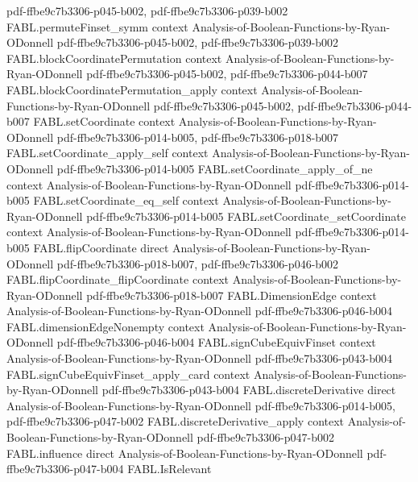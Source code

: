 \begin{theorem}
  {pdf-ffbe9c7b3306-p045-b002,
    pdf-ffbe9c7b3306-p039-b002}
\proofstep
  {FABL.permuteFinset_symm}
  {context}
  {Analysis-of-Boolean-Functions-by-Ryan-ODonnell}
  {pdf-ffbe9c7b3306-p045-b002,
    pdf-ffbe9c7b3306-p039-b002}
\proofstep
  {FABL.blockCoordinatePermutation}
  {context}
  {Analysis-of-Boolean-Functions-by-Ryan-ODonnell}
  {pdf-ffbe9c7b3306-p045-b002,
    pdf-ffbe9c7b3306-p044-b007}
\proofstep
  {FABL.blockCoordinatePermutation_apply}
  {context}
  {Analysis-of-Boolean-Functions-by-Ryan-ODonnell}
  {pdf-ffbe9c7b3306-p045-b002,
    pdf-ffbe9c7b3306-p044-b007}
\proofstep
  {FABL.setCoordinate}
  {context}
  {Analysis-of-Boolean-Functions-by-Ryan-ODonnell}
  {pdf-ffbe9c7b3306-p014-b005,
    pdf-ffbe9c7b3306-p018-b007}
\proofstep
  {FABL.setCoordinate_apply_self}
  {context}
  {Analysis-of-Boolean-Functions-by-Ryan-ODonnell}
  {pdf-ffbe9c7b3306-p014-b005}
\proofstep
  {FABL.setCoordinate_apply_of_ne}
  {context}
  {Analysis-of-Boolean-Functions-by-Ryan-ODonnell}
  {pdf-ffbe9c7b3306-p014-b005}
\proofstep
  {FABL.setCoordinate_eq_self}
  {context}
  {Analysis-of-Boolean-Functions-by-Ryan-ODonnell}
  {pdf-ffbe9c7b3306-p014-b005}
\proofstep
  {FABL.setCoordinate_setCoordinate}
  {context}
  {Analysis-of-Boolean-Functions-by-Ryan-ODonnell}
  {pdf-ffbe9c7b3306-p014-b005}
\proofstep
  {FABL.flipCoordinate}
  {direct}
  {Analysis-of-Boolean-Functions-by-Ryan-ODonnell}
  {pdf-ffbe9c7b3306-p018-b007,
    pdf-ffbe9c7b3306-p046-b002}
\proofstep
  {FABL.flipCoordinate_flipCoordinate}
  {context}
  {Analysis-of-Boolean-Functions-by-Ryan-ODonnell}
  {pdf-ffbe9c7b3306-p018-b007}
\proofstep
  {FABL.DimensionEdge}
  {context}
  {Analysis-of-Boolean-Functions-by-Ryan-ODonnell}
  {pdf-ffbe9c7b3306-p046-b004}
\proofstep
  {FABL.dimensionEdgeNonempty}
  {context}
  {Analysis-of-Boolean-Functions-by-Ryan-ODonnell}
  {pdf-ffbe9c7b3306-p046-b004}
\proofstep
  {FABL.signCubeEquivFinset}
  {context}
  {Analysis-of-Boolean-Functions-by-Ryan-ODonnell}
  {pdf-ffbe9c7b3306-p043-b004}
\proofstep
  {FABL.signCubeEquivFinset_apply_card}
  {context}
  {Analysis-of-Boolean-Functions-by-Ryan-ODonnell}
  {pdf-ffbe9c7b3306-p043-b004}
\proofstep
  {FABL.discreteDerivative}
  {direct}
  {Analysis-of-Boolean-Functions-by-Ryan-ODonnell}
  {pdf-ffbe9c7b3306-p014-b005,
    pdf-ffbe9c7b3306-p047-b002}
\proofstep
  {FABL.discreteDerivative_apply}
  {context}
  {Analysis-of-Boolean-Functions-by-Ryan-ODonnell}
  {pdf-ffbe9c7b3306-p047-b002}
\proofstep
  {FABL.influence}
  {direct}
  {Analysis-of-Boolean-Functions-by-Ryan-ODonnell}
  {pdf-ffbe9c7b3306-p047-b004}
\proofstep
  {FABL.IsRelevant}

\end{theorem}
